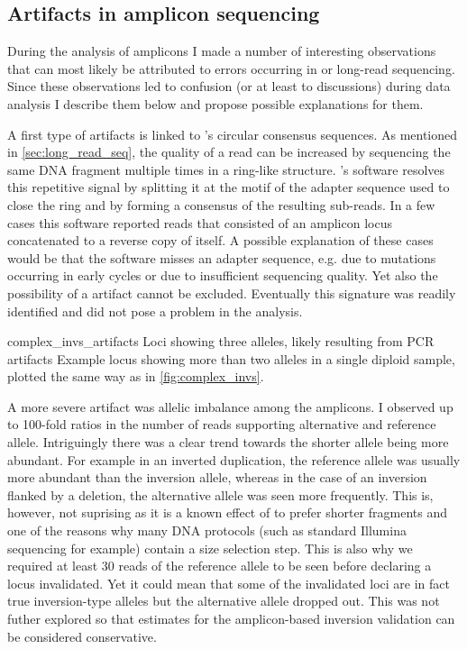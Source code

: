 \FloatBarrier
\subsection{Artifacts in amplicon sequencing}
\label{sec:complex_invs_artifacts}

During the analysis of amplicons I made a number of interesting observations
that can most likely be attributed to errors occurring in \pcr or long-read
sequencing. Since these observations led to confusion (or at least to
discussions) during data analysis I describe them below and propose possible
explanations for them.

A first type of artifacts is linked to \pacbio's circular consensus sequences.
As mentioned in \cref{sec:long_read_seq}, the quality of a \pacbio read can be
increased by sequencing the same DNA fragment multiple times in a ring-like
structure. \pacbio’s software resolves this repetitive signal by splitting it at
the motif of the adapter sequence used to close the ring and by forming a
consensus of the resulting sub-reads. In a few cases this software reported
reads that consisted of an amplicon locus concatenated to a reverse copy of
itself. A possible explanation of these cases would be that the software misses
an adapter sequence, e.g. due to mutations occurring in early \pcr cycles or due
to insufficient sequencing quality. Yet also the possibility of a \pcr artifact
cannot be excluded. Eventually this signature was readily identified and did not
pose a problem in the analysis.

    {complex_invs_artifacts}
    {Loci showing three alleles, likely resulting from PCR artifacts}
    {Example locus showing more than two alleles in a single diploid sample,
    plotted the same way as in \cref{fig:complex_invs}.}

A more severe artifact was allelic imbalance among the \pcr amplicons. I
observed up to 100-fold ratios in the number of reads supporting alternative and
reference allele. Intriguingly there was a clear trend towards the shorter
allele being more abundant. For example in an inverted duplication, the
reference allele was usually more abundant than the inversion allele, whereas in
the case of an inversion flanked by a deletion, the alternative allele was seen
more frequently. This is, however, not suprising as it is a known effect of \pcr
to prefer shorter fragments and one of the reasons why many DNA protocols (such
as standard Illumina sequencing for example) contain a size selection step. This
is also why we required at least 30 reads of the reference allele to be seen
before declaring a locus invalidated. Yet it could mean that some of the
invalidated loci are in fact true inversion-type alleles but the alternative
allele dropped out. This was not futher explored so that \fdr estimates for the
amplicon-based inversion validation can be considered conservative.


